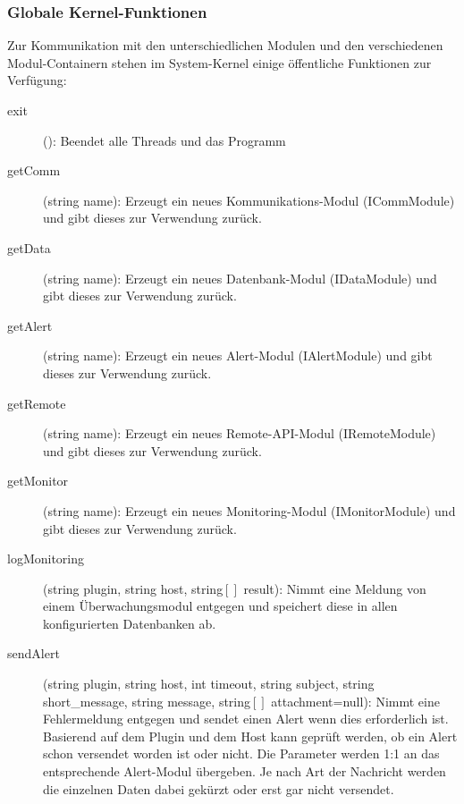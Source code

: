 \subsubsection{Globale Kernel-Funktionen} \label{sec:praxis-basis-global}
Zur Kommunikation mit den unterschiedlichen Modulen und den verschiedenen Modul-Containern stehen im System-Kernel einige \"offentliche Funktionen zur Verf\"ugung:
\begin{description}
\item[exit](): Beendet alle Threads und das Programm

\item[getComm](string name): Erzeugt ein neues Kommunikations-Modul (ICommModule) und gibt dieses zur Verwendung zur\"uck.

\item[getData](string name): Erzeugt ein neues Datenbank-Modul (IDataModule) und gibt dieses zur Verwendung zur\"uck.

\item[getAlert](string name): Erzeugt ein neues Alert-Modul (IAlertModule) und gibt dieses zur Verwendung zur\"uck.

\item[getRemote](string name): Erzeugt ein neues Remote-API-Modul (IRemoteModule) und gibt dieses zur Verwendung zur\"uck.

\item[getMonitor](string name): Erzeugt ein neues Monitoring-Modul (IMonitorModule) und gibt dieses zur Verwendung zur\"uck.

\item[logMonitoring](string plugin, string host, string$\left[ \right]$ result): Nimmt eine Meldung von einem \"Uberwachungsmodul entgegen und speichert diese in allen konfigurierten Datenbanken ab.

\item[sendAlert](string plugin, string host, int timeout, string subject, string short\_message, string message, string$\left[ \right]$ attachment=null): Nimmt eine Fehlermeldung entgegen und sendet einen Alert wenn dies erforderlich ist. Basierend auf dem Plugin und dem Host kann gepr\"uft werden, ob ein Alert schon versendet worden ist oder nicht. Die Parameter werden 1:1 an das entsprechende Alert-Modul \"ubergeben. Je nach Art der Nachricht werden die einzelnen Daten dabei gek\"urzt oder erst gar nicht versendet.


\end{description}
